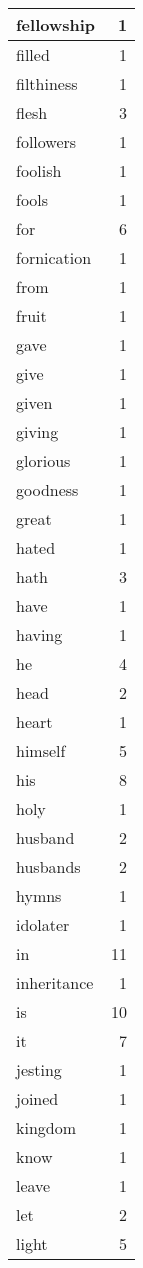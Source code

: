 \begin{center}
\begin{longtable}{l|r}
fellowship & 1\\ \hline 
filled & 1\\ \hline 
filthiness & 1\\ \hline 
flesh & 3\\ \hline 
followers & 1\\ \hline 
foolish & 1\\ \hline 
fools & 1\\ \hline 
for & 6\\ \hline 
fornication & 1\\ \hline 
from & 1\\ \hline 
fruit & 1\\ \hline 
gave & 1\\ \hline 
give & 1\\ \hline 
given & 1\\ \hline 
giving & 1\\ \hline 
glorious & 1\\ \hline 
goodness & 1\\ \hline 
great & 1\\ \hline 
hated & 1\\ \hline 
hath & 3\\ \hline 
have & 1\\ \hline 
having & 1\\ \hline 
he & 4\\ \hline 
head & 2\\ \hline 
heart & 1\\ \hline 
himself & 5\\ \hline 
his & 8\\ \hline 
holy & 1\\ \hline 
husband & 2\\ \hline 
husbands & 2\\ \hline 
hymns & 1\\ \hline 
idolater & 1\\ \hline 
in & 11\\ \hline 
inheritance & 1\\ \hline 
is & 10\\ \hline 
it & 7\\ \hline 
jesting & 1\\ \hline 
joined & 1\\ \hline 
kingdom & 1\\ \hline 
know & 1\\ \hline 
leave & 1\\ \hline 
let & 2\\ \hline 
light & 5\\ \hline 

\end{longtable}
\end{center}
